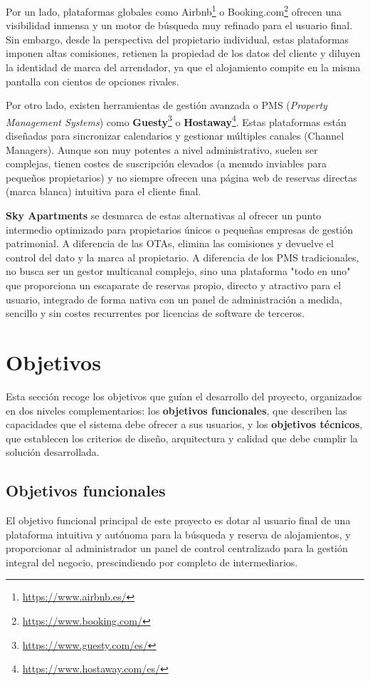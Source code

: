 Por un lado, plataformas globales como Airbnb\footnote{\url{https://www.airbnb.es/}} o Booking.com\footnote{\url{https://www.booking.com/}} ofrecen una visibilidad inmensa y un motor de búsqueda muy refinado para el usuario final. Sin embargo, desde la perspectiva del propietario individual, estas plataformas imponen altas comisiones, retienen la propiedad de los datos del cliente y diluyen la identidad de marca del arrendador, ya que el alojamiento compite en la misma pantalla con cientos de opciones rivales.

Por otro lado, existen herramientas de gestión avanzada o PMS (\textit{Property Management Systems}) como \textbf{Guesty}\footnote{\url{https://www.guesty.com/es/}} o \textbf{Hostaway}\footnote{\url{https://www.hostaway.com/es/}}. Estas plataformas están diseñadas para sincronizar calendarios y gestionar múltiples canales (Channel Managers). Aunque son muy potentes a nivel administrativo, suelen ser complejas, tienen costes de suscripción elevados (a menudo inviables para pequeños propietarios) y no siempre ofrecen una página web de reservas directas (marca blanca) intuitiva para el cliente final.

\textbf{Sky Apartments} se desmarca de estas alternativas al ofrecer un punto intermedio optimizado para propietarios únicos o pequeñas empresas de gestión patrimonial. A diferencia de las OTAs, elimina las comisiones y devuelve el control del dato y la marca al propietario. A diferencia de los PMS tradicionales, no busca ser un gestor multicanal complejo, sino una plataforma "todo en uno" que proporciona un escaparate de reservas propio, directo y atractivo para el usuario, integrado de forma nativa con un panel de administración a medida, sencillo y sin costes recurrentes por licencias de software de terceros.

\section{Objetivos}
\label{sec:objetivos}
Esta sección recoge los objetivos que guían el desarrollo del proyecto, organizados en dos niveles complementarios: los \textbf{objetivos funcionales}, que describen las capacidades que el sistema debe ofrecer a sus usuarios, y los \textbf{objetivos técnicos}, que establecen los criterios de diseño, arquitectura y calidad que debe cumplir la solución desarrollada.
\subsection{Objetivos funcionales} 
El objetivo funcional principal de este proyecto es dotar al usuario final de una plataforma intuitiva y autónoma para la búsqueda y reserva de alojamientos, y proporcionar al administrador un panel de control centralizado para la gestión integral del negocio, prescindiendo por completo de intermediarios.

